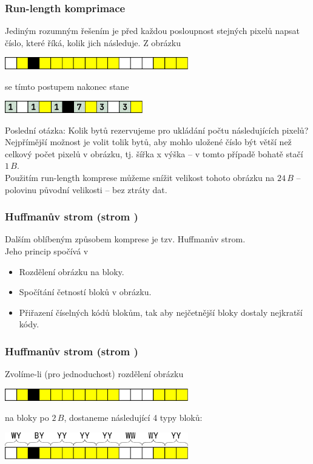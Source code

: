 \documentclass[aspectratio=169,11pt,svgnames]{beamer}
\begin{document}
\begin{frame}
 \frametitle{Run-length komprimace}
 Jediným rozumným řešením je před každou posloupnost stejných pixelů napsat
 číslo, které říká, kolik jich následuje.
 \pause
 Z obrázku
 \begin{center}
  \includegraphics[width=8cm]{image-4.pdf}
  \vspace*{-.5em}
 \end{center}
 se tímto postupem nakonec stane
 \pause
 \begin{center}
  \includegraphics[width=6cm]{image-6.pdf}
  \vspace*{-.5em}
 \end{center}
 \pause
 Poslední otázka: Kolik bytů rezervujeme pro ukládání počtu následujících
 pixelů?\pause\\
 Nejpřímější možnost je volit tolik bytů, aby mohlo uložené číslo být větší než
 celkový počet pixelů v obrázku, tj. šířka x výška -- v tomto případě bohatě
 stačí $1\,B$.\pause\\
 Použitím \alert{run-length} komprese můžeme snížit velikost tohoto obrázku na
 $24\,B$ -- polovinu původní velikosti -- \alert{bez ztráty dat}.
\end{frame}

\begin{frame}
 \frametitle{Huffmanův strom (strom )}
 Dalším oblíbeným způsobem komprese je tzv. \alert{Huffmanův strom}.\pause\\
 Jeho princip spočívá v
 \begin{itemize}[label=\textbullet]
  \item Rozdělení obrázku na bloky.
  \pause
  \item Spočítání četností bloků v obrázku.
  \pause
  \item Přiřazení číselných kódů blokům, tak aby \alert{nejčetnější bloky
   dostaly nejkratší kódy}.
 \end{itemize}
\end{frame}

\begin{frame}
 \frametitle{Huffmanův strom (strom )}
 Zvolíme-li (pro jednoduchost) rozdělení obrázku
 \begin{center}
  \includegraphics[width=8cm]{image-4.pdf}
  \vspace*{-.5em}
 \end{center}
 na bloky po $2\,B$, dostaneme následující 4 typy bloků:
 \begin{center}
  \includegraphics[width=8cm]{image-7.pdf}
  \vspace*{-.5em}
 \end{center}
\end{frame}
\end{document}
